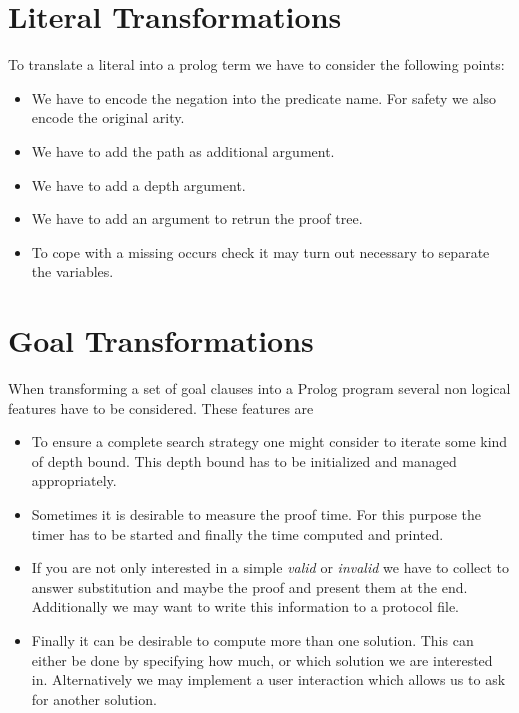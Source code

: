 

\def\Proof{\mbox{\it Proof}}
\def\goal#1{\mbox{\it goal#1}}


\section{Literal Transformations}

To translate a literal into a prolog term we have to consider the following
points:
\begin{itemize}
  \item We have to encode the negation into the predicate name. For safety we
  also encode the original arity.
  \item We have to add the path as additional argument.
  \item We have to add a depth argument.
  \item We have to add an argument to retrun the proof tree.
  \item To cope with a missing occurs check it may turn out necessary to
  separate the variables.
\end{itemize}



\section{Goal Transformations}

When transforming a set of goal clauses into a Prolog program several non
logical features have to be considered. These features are
\begin{itemize}
  \item To ensure a complete search strategy one might consider to iterate
  some kind of depth bound. This depth bound has to be initialized and managed
  appropriately. 
  \item Sometimes it is desirable to measure the proof time. For this purpose
  the timer has to be started and finally the time computed and printed.
  \item If you are not only interested in a simple {\em valid} or {\em
  invalid} we have to collect to answer substitution and maybe the proof and
  present them at the end. Additionally we may want to write this information
  to a protocol file.
  \item Finally it can be desirable to compute more than one solution. This
  can either be done by specifying how much, or which solution we are
  interested in. Alternatively we may implement a user interaction which
  allows us to ask for another solution.
\end{itemize}

